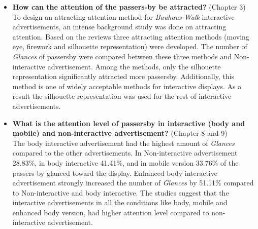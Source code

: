 







\begin{itemize}

\item \textbf{ How can the attention of the passers-by be attracted?} (Chapter 3) \\
To design an attracting attention method for \emph{Bauhaus-Walk} interactive advertisements, an intense background study was done on attracting attention. Based on the reviews three attracting attention methods (moving eye, firework and silhouette representation) were developed. The number of \emph{Glances} of passersby were compared between these three methods and Non-interactive advertisement. Among the methods, only the silhouette representation significantly attracted more passersby. Additionally, this method is one of widely acceptable methods for interactive displays. As a result the silhouette representation was used for the rest of interactive advertisements.

\item \textbf{What is the attention level of passersby in interactive (body and mobile) and non-interactive advertisement?} (Chapter 8 and 9)\\
The body interactive advertisement had the highest amount of \emph{Glances} compared to the other advertisements. In Non-interactive advertisement 28.83\%, in body interactive 41.41\%, and in mobile version 33.76\% of the passers-by glanced toward the display. Enhanced body interactive advertisement strongly increased the number of \emph{Glances} by 51.11\% compared to Non-interactive and body interactive. The studies suggest that the interactive advertisements in all the conditions like body, mobile and enhanced body version, had higher attention level compared to non-interactive advertisement. 



\begin{table}[H]
\caption{Week sequence}
\label{tab:advertisementWeeks}
\centering
{}
\end{table}







\end{itemize}
